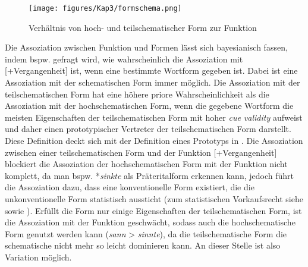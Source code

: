 \begin{figure}
\texttt{[image: figures/Kap3/formschema.png]}
\caption{Verhältnis von hoch- und teilschematischer Form zur Funktion}
\label{formschema}
\end{figure} 

Die Assoziation zwischen Funktion und Formen lässt sich bayesianisch fassen, indem bspw. gefragt wird, wie wahrscheinlich die Assoziation mit [+Vergangenheit] ist, wenn eine bestimmte Wortform gegeben ist. Dabei ist eine Assoziation mit der schematischen Form immer möglich. Die Assoziation mit der teilschematischen Form hat eine höhere priore Wahrscheinlichkeit als die Assoziation mit der hochschematischen Form, wenn die gegebene Wortform die meisten Eigenschaften der teilschematischen Form mit hoher \textit{cue validity} aufweist und daher einen prototypischer Vertreter der teilschematischen Form darstellt. Diese Definition deckt sich mit der Definition eines Prototyps in . Die Assoziation zwischen einer teilschematischen Form und der Funktion [+Vergangenheit] blockiert die Assoziation der hochschematischen Form mit der Funktion nicht komplett, da man bspw. *\textit{sinkte} als Präteritalform erkennen kann, jedoch führt die Assoziation dazu, dass eine konventionelle Form existiert, die die unkonventionelle Form statistisch aussticht (zum statistischen Vorkaufsrecht siehe \cite[74--94]{Goldberg.2019} sowie ).  Erfüllt die Form nur einige Eigenschaften der teilschematischen Form, ist die Assoziation mit der Funktion geschwächt, sodass auch die hochschematische Form genutzt werden kann (\textit{sann} > \textit{sinnte}), da die teilschematische Form die schematische nicht mehr so leicht dominieren kann. An dieser Stelle ist also Variation möglich.



